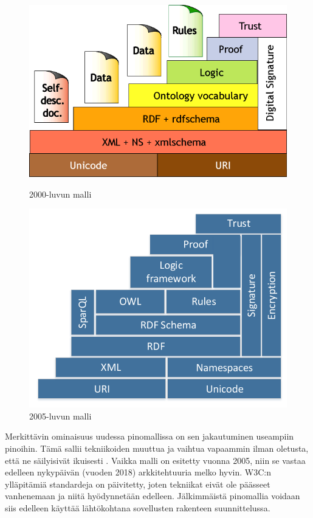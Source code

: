 \documentclass[finnish, 12pt, a4paper, elec, utf8, pdfa, online]{aaltothesis}
\begin{document}
{%
\begin{figure}[htb]
\begin{minipage}[b]{0.48\linewidth}
\includegraphics[width=\linewidth]{images/sweb-stack.png}
\caption{2000-luvun malli \cite{stack_bl} \label{images/sweb-stack.png}}
\end{minipage}
\hfill
\begin{minipage}[b]{0.48\linewidth}
\includegraphics[width=\linewidth]{images/Semantic_web_stack_one_col.pdf}
\caption{2005-luvun malli \cite{stack} \label{images/Semantic_web_stack_one_col.pdf}}
\end{minipage}%
\end{figure}
\enlargethispage{-\baselineskip}
Merkittävin ominaisuus uudessa pinomallissa on sen jakautuminen useampiin pinoihin. Tämä sallii tekniikoiden muuttua ja vaihtua vapaammin ilman oletusta, että ne säilyisivät ikuisesti \cite{stack}. Vaikka malli on esitetty vuonna 2005, niin se vastaa edelleen nykypäivän (vuoden 2018) arkkitehtuuria melko hyvin. W3C:n ylläpitämiä standardeja on päivitetty, joten tekniikat eivät ole päässeet vanhenemaan ja niitä hyödynnetään edelleen. Jälkimmäistä pinomallia voidaan siis edelleen käyttää lähtökohtana sovellusten rakenteen suunnittelussa.
\clearpage

}
\end{document}
